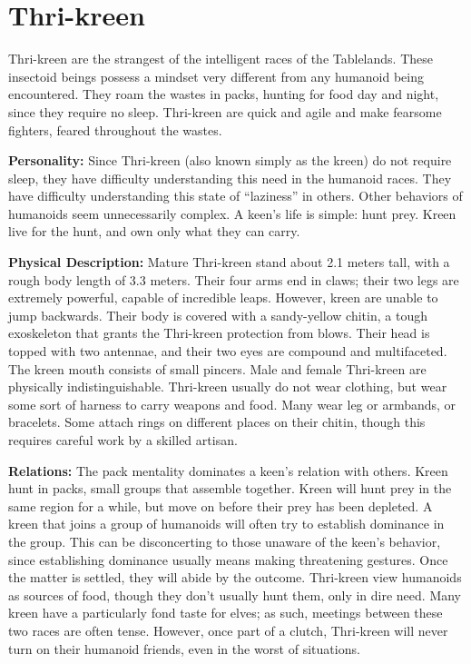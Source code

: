 \section{Thri-kreen}

Thri-kreen are the strangest of the intelligent races of the Tablelands. These insectoid beings possess a mindset very different from any humanoid being encountered. They roam the wastes in packs, hunting for food day and night, since they require no sleep. Thri-kreen are quick and agile and make fearsome fighters, feared throughout the wastes.

\textbf{Personality:} Since Thri-kreen (also known simply as the kreen) do not require sleep, they have difficulty understanding this need in the humanoid races. They have difficulty understanding this state of ``laziness'' in others. Other behaviors of humanoids seem unnecessarily complex. A keen's life is simple: hunt prey. Kreen live for the hunt, and own only what they can carry.

\textbf{Physical Description:} Mature Thri-kreen stand about 2.1 meters tall, with a rough body length of 3.3 meters. Their four arms end in claws; their two legs are extremely powerful, capable of incredible leaps. However, kreen are unable to jump backwards. Their body is covered with a sandy-yellow chitin, a tough exoskeleton that grants the Thri-kreen protection from blows. Their head is topped with two antennae, and their two eyes are compound and multifaceted. The kreen mouth consists of small pincers. Male and female Thri-kreen are physically indistinguishable. Thri-kreen usually do not wear clothing, but wear some sort of harness to carry weapons and food. Many wear leg or armbands, or bracelets. Some attach rings on different places on their chitin, though this requires careful work by a skilled artisan.

\textbf{Relations:} The pack mentality dominates a keen's relation with others. Kreen hunt in packs, small groups that assemble together. Kreen will hunt prey in the same region for a while, but move on before their prey has been depleted. A kreen that joins a group of humanoids will often try to establish dominance in the group. This can be disconcerting to those unaware of the keen's behavior, since establishing dominance usually means making threatening gestures. Once the matter is settled, they will abide by the outcome. Thri-kreen view humanoids as sources of food, though they don't usually hunt them, only in dire need. Many kreen have a particularly fond taste for elves; as such, meetings between these two races are often tense. However, once part of a clutch, Thri-kreen will never turn on their humanoid friends, even in the worst of situations.

